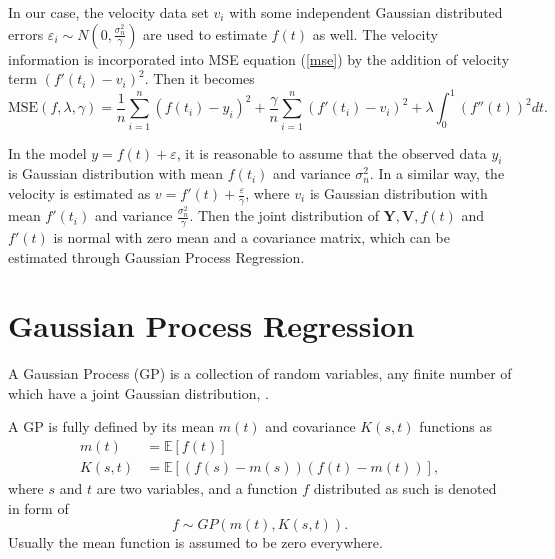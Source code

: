 In our case, the velocity data set $v_i$ with some independent Gaussian distributed errors $\varepsilon_i \sim N(0, \frac{\sigma_n^2}{\gamma})$ are used to estimate $f(t)$ as well. The velocity information  is incorporated into MSE  equation (\ref{mse}) by the addition of velocity term $(f'(t_i)-v_i)^2$. Then it becomes 
\begin{equation}\label{mse2}
\text{MSE}(f,\lambda,\gamma)=\frac{1}{n}\sum_{i=1}^n(f(t_i)-y_i)^2+\frac{\gamma}{n} \sum_{i=1}^n(f'(t_i)-v_i)^2+\lambda \int_{0}^{1}(f''(t))^2dt.
\end{equation}

In the model $y=f(t)+\varepsilon$, it is reasonable to assume that the observed data $y_i$ is Gaussian distribution with mean $f(t_i)$ and variance $\sigma_n^2$. In a similar way, the velocity is estimated as  $v=f'(t)+\frac{\varepsilon}{\gamma}$, where $v_i$ is Gaussian distribution with mean $f'(t_i)$ and variance $\frac{\sigma_n^2}{\gamma}$. Then the joint distribution of $\mathbf{Y},\mathbf{V},f(t)$ and $f'(t)$ is normal with zero mean and a covariance matrix, which can be estimated through Gaussian Process Regression.

\section{Gaussian Process Regression}

A Gaussian Process (GP) is a collection of random variables, any finite number of which have a joint Gaussian distribution, \cite{b_gpml}.

A GP is fully defined by its mean $m(t)$ and covariance $K(s,t)$ functions as
\begin{align*}
m(t)&=\mathbb{E}[f(t)] \\
K(s,t)&=\mathbb{E}[(f(s)-m(s)) (f(t)-m(t))],
\end{align*}
where $s$ and $t$ are two variables, and a function $f$ distributed as such is denoted in form of
\begin{equation}
f \sim GP(m(t),K(s,t)).
\end{equation}
Usually the mean function is assumed to be zero everywhere. 

